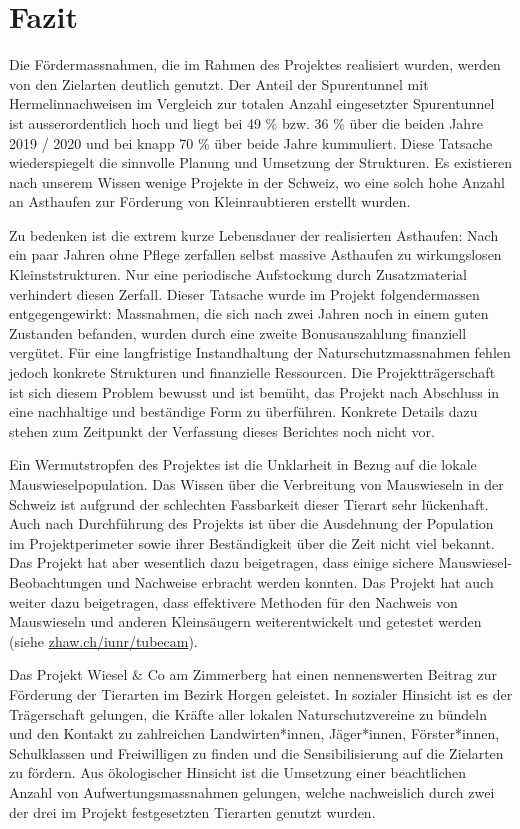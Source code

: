 \documentclass[
]{scrbook}
\begin{document}
\hypertarget{fazit}{%
\section{Fazit}\label{fazit}}

Die Fördermassnahmen, die im Rahmen des Projektes realisiert wurden, werden von den Zielarten deutlich genutzt. Der Anteil der Spurentunnel mit Hermelinnachweisen im Vergleich zur totalen Anzahl eingesetzter Spurentunnel ist ausserordentlich hoch und liegt bei 49 \% bzw. 36 \% über die beiden Jahre 2019 / 2020 und bei knapp 70 \% über beide Jahre kummuliert. Diese Tatsache wiederspiegelt die sinnvolle Planung und Umsetzung der Strukturen. Es existieren nach unserem Wissen wenige Projekte in der Schweiz, wo eine solch hohe Anzahl an Asthaufen zur Förderung von Kleinraubtieren erstellt wurden.

Zu bedenken ist die extrem kurze Lebensdauer der realisierten Asthaufen: Nach ein paar Jahren ohne Pflege zerfallen selbst massive Asthaufen zu wirkungslosen Kleinststrukturen. Nur eine periodische Aufstockung durch Zusatzmaterial verhindert diesen Zerfall. Dieser Tatsache wurde im Projekt folgendermassen entgegengewirkt: Massnahmen, die sich nach zwei Jahren noch in einem guten Zustanden befanden, wurden durch eine zweite Bonusauszahlung finanziell vergütet. Für eine langfristige Instandhaltung der Naturschutzmassnahmen fehlen jedoch konkrete Strukturen und finanzielle Ressourcen. Die Projektträgerschaft ist sich diesem Problem bewusst und ist bemüht, das Projekt nach Abschluss in eine nachhaltige und beständige Form zu überführen. Konkrete Details dazu stehen zum Zeitpunkt der Verfassung dieses Berichtes noch nicht vor.

Ein Wermutstropfen des Projektes ist die Unklarheit in Bezug auf die lokale Mauswieselpopulation. Das Wissen über die Verbreitung von Mauswieseln in der Schweiz ist aufgrund der schlechten Fassbarkeit dieser Tierart sehr lückenhaft. Auch nach Durchführung des Projekts ist über die Ausdehnung der Population im Projektperimeter sowie ihrer Beständigkeit über die Zeit nicht viel bekannt. Das Projekt hat aber wesentlich dazu beigetragen, dass einige sichere Mauswiesel-Beobachtungen und Nachweise erbracht werden konnten. Das Projekt hat auch weiter dazu beigetragen, dass effektivere Methoden für den Nachweis von Mauswieseln und anderen Kleinsäugern weiterentwickelt und getestet werden (siehe \href{http://www.zhaw.ch/iunr/tubecam}{zhaw.ch/iunr/tubecam}).

Das Projekt Wiesel \& Co am Zimmerberg hat einen nennenswerten Beitrag zur Förderung der Tierarten im Bezirk Horgen geleistet. In sozialer Hinsicht ist es der Trägerschaft gelungen, die Kräfte aller lokalen Naturschutzvereine zu bündeln und den Kontakt zu zahlreichen Landwirten*innen, Jäger*innen, Förster*innen, Schulklassen und Freiwilligen zu finden und die Sensibilisierung auf die Zielarten zu fördern. Aus ökologischer Hinsicht ist die Umsetzung einer beachtlichen Anzahl von Aufwertungsmassnahmen gelungen, welche nachweislich durch zwei der drei im Projekt festgesetzten Tierarten genutzt wurden.
\end{document}

